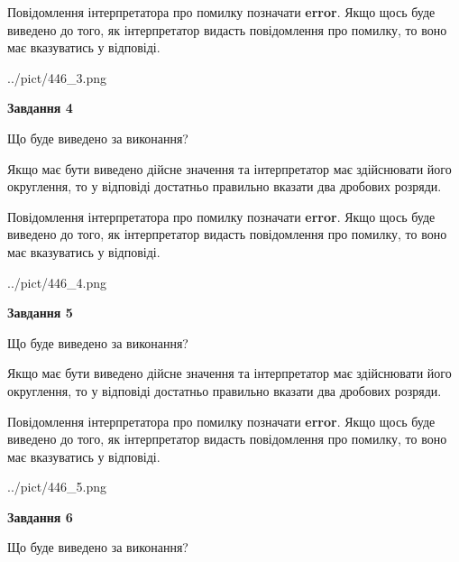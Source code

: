 \documentclass[12pt, ukrainian]{article}
\begin{document}
{\begin {Large}
Повідомлення інтерпретатора про помилку позначати \textbf{error}.
Якщо щось буде виведено до того, як інтерпретатор видасть повідомлення про помилку, 
то воно має вказуватись у відповіді. \par

\begin{center}
	{../pict/446_3.png}
\end{center}
\newpage

{\begin {center}\textbf{Завдання 4}\end {center}}\par
Що буде виведено за виконання? \par

Якщо має бути виведено дійсне значення та інтерпретатор має здійснювати його округлення, 
то у відповіді достатньо правильно вказати два дробових розряди.

Повідомлення інтерпретатора про помилку позначати \textbf{error}.
Якщо щось буде виведено до того, як інтерпретатор видасть повідомлення про помилку, 
то воно має вказуватись у відповіді. \par

\begin{center}
	{../pict/446_4.png}
\end{center}
\newpage

{\begin {center}\textbf{Завдання 5}\end {center}}\par
Що буде виведено за виконання? \par

Якщо має бути виведено дійсне значення та інтерпретатор має здійснювати його округлення, 
то у відповіді достатньо правильно вказати два дробових розряди.

Повідомлення інтерпретатора про помилку позначати \textbf{error}.
Якщо щось буде виведено до того, як інтерпретатор видасть повідомлення про помилку, 
то воно має вказуватись у відповіді. \par

\begin{center}
	{../pict/446_5.png}
\end{center}
\newpage

{\begin {center}\textbf{Завдання 6}\end {center}}\par
Що буде виведено за виконання? \par


\end{Large}}
\end{document}
